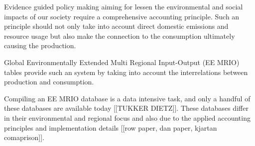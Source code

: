 Evidence guided policy making aiming for lessen the environmental and social
impacts of our society require a comprehensive accounting principle. Such an principle should not only take into account direct domestic emissions and resource usage but also make the connection to the consumption ultimately causing the production.

Global Environmentally Extended Multi Regional Input-Output (EE MRIO) tables provide such an system by taking into account the interrelations between production and consumption. 

Compiling an EE MRIO database is a data intensive task, and only a handful of these databases are available today [[TUKKER DIETZ]]. These databases differ in their environmental and regional focus and also due to the applied accounting principles and implementation
details [[row paper, dan paper, kjartan comaprison]]. 